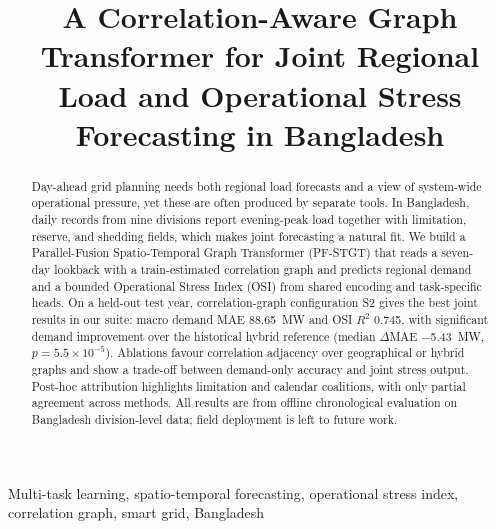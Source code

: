\documentclass[conference]{IEEEtran}
\begin{document}
\raggedbottom

\title{A Correlation-Aware Graph Transformer for Joint Regional Load and Operational Stress Forecasting in Bangladesh}



\maketitle

\begin{abstract}
Day-ahead grid planning needs both regional load forecasts and a view of system-wide operational pressure, yet these are often produced by separate tools. In Bangladesh, daily records from nine divisions report evening-peak load together with limitation, reserve, and shedding fields, which makes joint forecasting a natural fit. We build a Parallel-Fusion Spatio-Temporal Graph Transformer (PF-STGT) that reads a seven-day lookback with a train-estimated correlation graph and predicts regional demand and a bounded Operational Stress Index (OSI) from shared encoding and task-specific heads. On a held-out test year, correlation-graph configuration S2 gives the best joint results in our suite: macro demand MAE 88.65~MW and OSI $R^2$ 0.745, with significant demand improvement over the historical hybrid reference (median $\Delta$MAE $-$5.43~MW, $p = 5.5 \times 10^{-5}$). Ablations favour correlation adjacency over geographical or hybrid graphs and show a trade-off between demand-only accuracy and joint stress output. Post-hoc attribution highlights limitation and calendar coalitions, with only partial agreement across methods. All results are from offline chronological evaluation on Bangladesh division-level data; field deployment is left to future work.
\end{abstract}

\begin{IEEEkeywords}
Multi-task learning, spatio-temporal forecasting, operational stress index, correlation graph, smart grid, Bangladesh
\end{IEEEkeywords}










\end{document}
